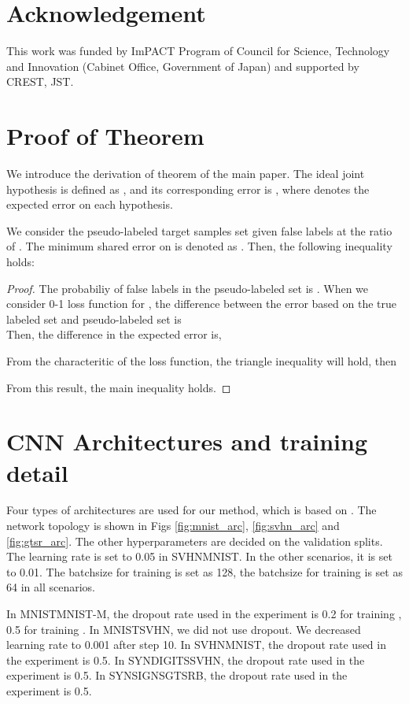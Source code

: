 \documentclass{article}
\begin{document}
\section{Acknowledgement}
This work was funded by ImPACT Program of Council for Science, Technology and Innovation (Cabinet Office, Government of Japan) and supported by CREST, JST.



\newpage
\section*{Proof of Theorem}
We introduce the derivation of theorem of the main paper.
The ideal joint hypothesis is defined as , and its corresponding error is , where  denotes the expected error on each hypothesis.

We consider the pseudo-labeled target samples set  given false labels at the ratio of . The minimum shared error on  is denoted as . Then, the following inequality holds:



\begin{proof}
  The probabiliy of false labels in the pseudo-labeled set  is .
  When we consider 0-1 loss function for , the difference between the error based on the true labeled set and pseudo-labeled set is
  \\
      Then, the difference in the expected error is,
  
  From the characteritic of the loss function, the triangle inequality will hold, then
  
  From this result, the main inequality holds.
 \end{proof}

\section*{CNN Architectures and training detail}
Four types of architectures are used for our method, which is based on \cite{ganin2014unsupervised}. The network topology is shown in Figs \ref{fig:mnist_arc}, \ref{fig:svhn_arc} and \ref{fig:gtsr_arc}. The other hyperparameters are decided on the validation splits. The learning rate is set to 0.05 in SVHNMNIST. In the other scenarios, it is set to 0.01. The batchsize for training  is set as 128, the batchsize for training  is set as 64 in all scenarios.

In MNISTMNIST-M, the dropout rate used in the experiment is 0.2 for training , 0.5 for training .
In MNISTSVHN, we did not use dropout. We decreased learning rate to 0.001 after step 10.
In SVHNMNIST, the dropout rate used in the experiment is 0.5.
In SYNDIGITSSVHN, the dropout rate used in the experiment is 0.5.
In SYNSIGNSGTSRB, the dropout rate used in the experiment is 0.5.
\end{document}
